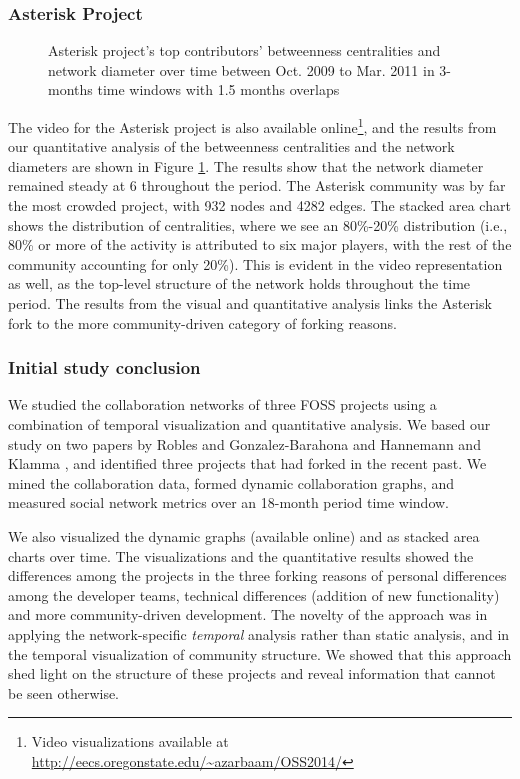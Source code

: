 \documentclass{report}
\begin{document}
\subsubsection{Asterisk Project}
\begin{figure}[H]
\centering
{}
\justifying
{}
\caption{Asterisk project's top contributors' betweenness centralities and network diameter over time between Oct. 2009 to Mar. 2011 in 3-months time windows with 1.5 months overlaps}
\label{figureAsteriskStackedAreaChart}
\end{figure}

The video for the Asterisk project is also available online\footnote{Video visualizations available at \href{http://eecs.oregonstate.edu/~azarbaam/OSS2014/}{http://eecs.oregonstate.edu/\textasciitilde azarbaam/OSS2014/}}, and the results from our quantitative analysis of the betweenness centralities and the network diameters are shown in Figure \ref{figureAsteriskStackedAreaChart}. The results show that the network diameter remained steady at 6 throughout the period. The Asterisk community was by far the most crowded project, with 932 nodes and 4282 edges. The stacked area chart shows the distribution of centralities, where we see an 80\%-20\% distribution (i.e., 80\% or more of the activity is attributed to six major players, with the rest of the community accounting for only 20\%). This is evident in the video representation as well, as the top-level structure of the network holds throughout the time period. The results from the visual and quantitative analysis links the Asterisk fork to the more community-driven category of forking reasons.

\subsubsection{Initial study conclusion}
We studied the collaboration networks of three FOSS projects using a combination of temporal visualization and quantitative analysis. We based our study on two papers by Robles and Gonzalez-Barahona \cite{Robles} and Hannemann and Klamma \cite{Hannemann}, and identified three projects that had forked in the recent past. We mined the collaboration data, formed dynamic collaboration graphs, and measured social network metrics over an 18-month period time window.

We also visualized the dynamic graphs (available online) and as stacked area charts over time. The visualizations and the quantitative results showed the differences among the projects in the three forking reasons of personal differences among the developer teams, technical differences (addition of new functionality) and more community-driven development. The novelty of the approach was in applying the network-specific \textit{temporal} analysis rather than static analysis, and in the temporal visualization of community structure. We showed that this approach shed light on the structure of these projects and reveal information that cannot be seen otherwise.
\end{document}
